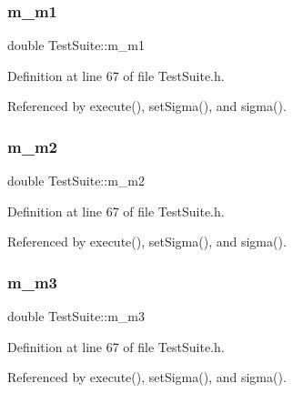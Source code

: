 \subsubsection{\texorpdfstring{m\+\_\+m1}{m\_m1}}
{\footnotesize\ttfamily double Test\+Suite\+::m\+\_\+m1\hspace{0.3cm}{\ttfamily [private]}}



Definition at line 67 of file Test\+Suite.\+h.



Referenced by execute(), set\+Sigma(), and sigma().

\mbox{\label{classTestSuite_a710aa6029d3d0b47b61a828a472f7546}} 
\subsubsection{\texorpdfstring{m\+\_\+m2}{m\_m2}}
{\footnotesize\ttfamily double Test\+Suite\+::m\+\_\+m2\hspace{0.3cm}{\ttfamily [private]}}



Definition at line 67 of file Test\+Suite.\+h.



Referenced by execute(), set\+Sigma(), and sigma().

\mbox{\label{classTestSuite_acbc062956d67a5f47dfb74286a390300}} 
\subsubsection{\texorpdfstring{m\+\_\+m3}{m\_m3}}
{\footnotesize\ttfamily double Test\+Suite\+::m\+\_\+m3\hspace{0.3cm}{\ttfamily [private]}}



Definition at line 67 of file Test\+Suite.\+h.



Referenced by execute(), set\+Sigma(), and sigma().

\mbox{\label{classTestSuite_ac3d39b72dd5fce4c48eb39ea56be3e36}} 
